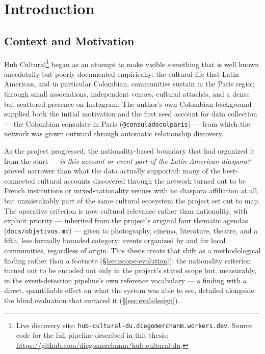 \documentclass[12pt, a4paper]{report}
\begin{document}
\tableofcontents

\chapter{Introduction}
\label{ch:introduction}

\section{Context and Motivation}
\label{sec:context}

Hub Cultural\footnote{Live discovery site:
\texttt{hub-cultural-du.diegomerchanm.workers.dev}. Source code for
the full pipeline described in this thesis:
\url{https://github.com/diegomerchanm/hub-cultural-du}.} began as an
attempt to make visible something that is well
known anecdotally but poorly documented empirically: the cultural life
that Latin American, and in particular Colombian, communities sustain in
the Paris region through small associations, independent venues, cultural
attachés, and a dense but scattered presence on Instagram. The author's
own Colombian background supplied both the initial motivation and the
first seed account for data collection — the Colombian consulate in
Paris (\texttt{@consuladocolparis}) — from which the network was grown
outward through automatic relationship discovery.

As the project progressed, the nationality-based boundary that had
organized it from the start — \emph{is this account or event part of the
Latin American diaspora?} — proved narrower than what the data actually
supported: many of the best-connected cultural accounts discovered
through the network turned out to be French institutions or
mixed-nationality venues with no diaspora affiliation at all, but
unmistakably part of the same cultural ecosystem the project set out to
map. The operative criterion is now cultural relevance rather than
nationality, with explicit priority — inherited from the project's
original four thematic agendas (\texttt{docs/objetivos.md}) — given to
photography, cinema, literature, theatre, and a fifth, less formally
bounded category: events organized by and for local communities,
regardless of origin. This thesis treats that shift as a methodological
finding rather than a footnote (\S\ref{sec:scope-evolution}): the
nationality criterion turned out to be encoded not only in the project's
stated scope but, measurably, in the event-detection pipeline's own
reference vocabulary — a finding with a direct, quantifiable effect on
what the system was able to see, detailed alongside the blind evaluation
that surfaced it (\S\ref{sec:eval-design}).
\end{document}
